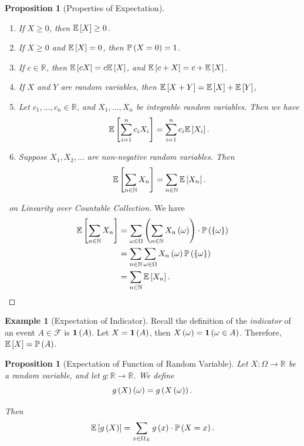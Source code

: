 \documentclass{article}
\newtheorem{proposition}[theorem]{Proposition}
\theoremstyle{definition}
\newtheorem{example}[theorem]{Example}
\theoremstyle{remark}
\newcommand{\RR}{\mathbb{R}}
\newcommand{\NN}{\mathbb{N}}
\newcommand{\Prob}{\mathbb{P}}
\newcommand{\Expt}{\mathbb{E}}
\newcommand{\eventSpace}{\mathcal{F}}
\newcommand{\indicator}{\mathbf{1}}
\newcommand{\functiondomain}[3]{#1:#2\to #3}
\begin{document}
\begin{proposition}[Properties of Expectation]
    \label{prop:properties-expectation}%
    \begin{enumerate}
        \item If \(X \geq 0\), then \(\Expt\bqty{X} \geq 0\).
        \item If \(X \geq 0\) and \(\Expt\bqty{X} = 0 \), then \(\Prob\pqty{X = 0} = 1\).
        \item If \(c \in \RR\), then \(\Expt\bqty{cX} = c \Expt\bqty{X}\), and \(\Expt\bqty{c + X} = c + \Expt\bqty{X}\).
        \item If \(X\) and \(Y\) are random variables, then \(\Expt\bqty{X + Y} = \Expt\bqty{X} + \Expt\bqty{Y}\),
        \item Let \(c_1, \ldots, c_n \in \RR\), and \(X_1, \ldots, X_n\) be integrable random variables. Then we have
        \[
            \Expt \bqty{\sum_{i = 1}^{n} c_i X_i} = \sum_{i = 1}^{n} c_i \Expt \bqty{X_i}.
        \]
        \item Suppose \(X_1, X_2, \ldots\) are non-negative random variables. Then
        \[
            \Expt\bqty{\sum_{n \in \NN} X_n} = \sum_{n \in \NN} \Expt\bqty{X_n}.
        \]
    \end{enumerate}
\end{proposition}

\begin{proof}[\proofname\ on Linearity over Countable Collection]
    We have
    \begin{align*}
        \Expt\bqty{\sum_{n \in \NN} X_n} &= \sum_{\omega \in \Omega} \pqty{\sum_{n \in \NN} X_n \pqty{\omega}} \cdot \Prob\pqty{\Bqty{\omega}} \\
        &= \sum_{n \in \NN} \sum_{\omega \in \Omega} X_n \pqty{\omega} \Prob\pqty{\Bqty{\omega}} \\
        &= \sum_{n \in \NN} \Expt\bqty{X_n}.
    \end{align*}
\end{proof}

\begin{example}[Expectation of Indicator]
    \label{ex:expectation-indicator}%
    Recall the definition of the \emph{indicator} of an event \(A \in \eventSpace\) is \(\indicator\pqty{A}\). Let \(X = \indicator\pqty{A}\), then \(X\pqty{\omega} = \indicator\pqty{\omega \in A}\). Therefore, \(\Expt\bqty{X} = \Prob\pqty{A}\).
\end{example}

\begin{proposition}[Expectation of Function of Random Variable]
    \label{prop:expectation-function-random-variable}%
    Let \(\functiondomain{X}{\Omega}{\RR}\) be a random variable, and let \(\functiondomain{g}{\RR}{\RR}\). We define
    \[
        g\left(X\right) \left(\omega\right) = g\left(X\left(\omega\right)\right).
    \]

    Then
    \[
        \Expt\bqty{g\pqty{X}} = \sum_{x \in \Omega_X} g\pqty{x} \cdot \Prob\pqty{X = x}.
    \]
\end{proposition}
\end{document}
